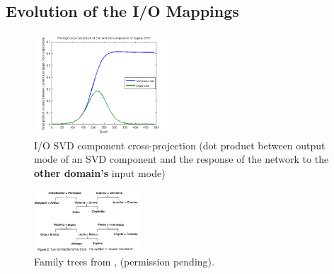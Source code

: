 \documentclass[10pt,letterpaper]{article}
\begin{document}
\subsection{Evolution of the I/O Mappings}
%
\begin{figure}
\centering
\includegraphics[width=0.45\textwidth]{figures/SVD_cross_projection_learning.png}
\caption{I/O SVD component cross-projection (dot product between output mode of an SVD component and the response of the network to the \textbf{other domain's} input mode)}
\label{SVD_cross_projection_learning}
\end{figure}
\begin{figure}
\centering
\includegraphics[width=0.35\textwidth]{figures/hinton_family_tree_figure.png}
\caption{Family trees from \citet{Hinton1986}, (permission pending).}
\label{hinton_family_tree_figure}
\end{figure}
\end{document}

